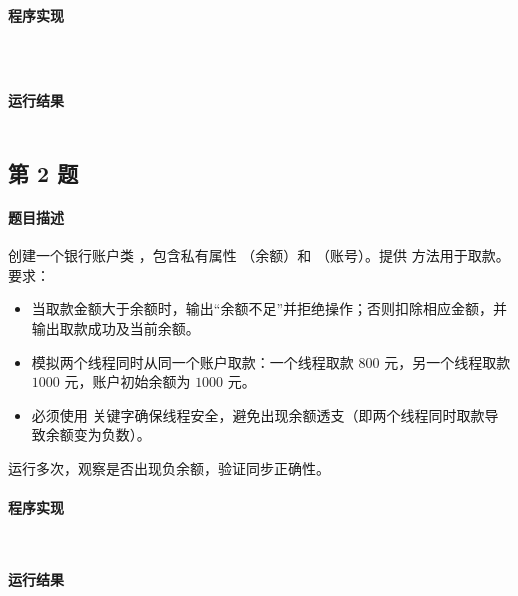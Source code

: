 \documentclass{academics}
\begin{document}
\paragraph{程序实现} {
    \inputminted[label=ExtendThread.java]{java}{../src/P01/ExtendThread.java}
    \inputminted[label=ImplementRunnable.java]{java}{../src/P01/ImplementRunnable.java}
    \inputminted[label=ThreadCreation.java]{java}{../src/P01/ThreadCreation.java}
}

\paragraph{运行结果} {
    \inputminted{text}{../res/P01.out}
}

\subsection{第 2 题}

\paragraph{题目描述} {
    创建一个银行账户类 ，包含私有属性 （余额）和 （账号）。提供  方法用于取款。要求：
    \begin{itemize}
        \item 当取款金额大于余额时，输出``余额不足''并拒绝操作；否则扣除相应金额，并输出取款成功及当前余额。
        \item 模拟两个线程同时从同一个账户取款：一个线程取款 $800$ 元，另一个线程取款 $1000$ 元，账户初始余额为 $1000$ 元。
        \item 必须使用  关键字确保线程安全，避免出现余额透支（即两个线程同时取款导致余额变为负数）。
    \end{itemize}
    运行多次，观察是否出现负余额，验证同步正确性。
}

\paragraph{程序实现} {
    \inputminted[label=Account.java]{java}{../src/P02/Account.java}
    \inputminted[label=AccountTest.java]{java}{../src/P02/AccountTest.java}
}

\paragraph{运行结果} {
    \inputminted{text}{../res/P02.out}
}
\end{document}
